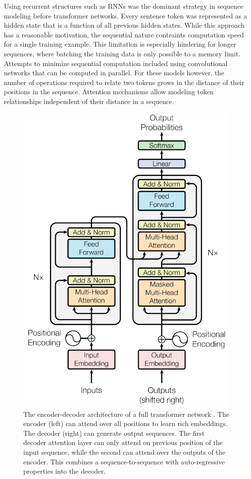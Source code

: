 \documentclass[../../main.tex]{subfiles}
\begin{document}
Using recurrent structures such as RNNs
was the dominant strategy in sequence modeling before transformer networks.
Every sentence token was represented as a hidden state
that is a function of all previous hidden states.
While this approach has a reasonable motivation,
the sequential nature contraints computation speed for a single training example.
This limitation is especially hindering for longer sequences,
where batching the training data is only possible to a memory limit.
Attempts to minimize sequential computation included using convolutional networks
that can be computed in parallel.
For these models however,
the number of operations required to relate two tokens
grows in the distance of their positions in the sequence.
Attention mechanisms allow modeling token relationships
independent of their distance in a sequence.

\begin{figure}[t]
    \centering
    \includegraphics[scale=0.4]{include/images/transformer_architecture.png}
    \caption{
        The encoder-decoder architecture
        of a full transformer network \cite{Vaswani2017}.
        The encoder (left) can attend over all positions to learn rich embeddings.
        The decoder (right) can generate output sequences.
        The first decoder attention layer
        can only attend on previous position of the input sequence,
        while the second can attend over the outputs of the encoder.
        This combines a sequence-to-sequence with
        auto-regressive properties into the decoder.
    }
    \label{fig:transformer_arch}
\end{figure}
\end{document}
